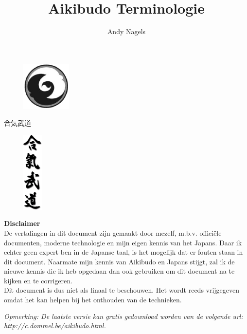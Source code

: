 \documentclass[a4paper, 12pt]{article}
\begin{document}
\begin{CJK*}{UTF8}{min}
\CJKtilde

%
%
\title{Aikibudo Terminologie}
\author{Andy Nagels}
\maketitle
\thispagestyle{empty} %
\begin{figure}[H]
\centering
\includegraphics[width=2.5cm]{img/schild_aikibudo.eps}
\end{figure}

\begin{center}
合気武道
\end{center}

\begin{figure}[H]
\centering
\includegraphics[width=1.0cm]{img/aikibudo-kanji.eps}
\end{figure}

%
%
\newpage
\begin{center}
\textbf{Disclaimer}\\
De vertalingen in dit document zijn gemaakt door mezelf, m.b.v. offici\"{e}le documenten, moderne technologie en mijn eigen kennis van het Japans. Daar ik echter geen expert ben in de Japanse taal, is het mogelijk dat er fouten staan in dit document. Naarmate mijn kennis van Aikibudo en Japans stijgt, zal ik de nieuwe kennis die ik heb opgedaan dan ook gebruiken om dit document na te kijken en te corrigeren.\\
Dit document is dus niet als finaal te beschouwen. Het wordt reeds vrijgegeven omdat het kan helpen bij het onthouden van de technieken.
\end{center}
\begin{center}
\textit{{\em Opmerking:} De laatste versie kan gratis gedownload worden van de
volgende url: http://c.dommel.be/aikibudo.html.}
\end{center}


\end{CJK*}
\end{document}
